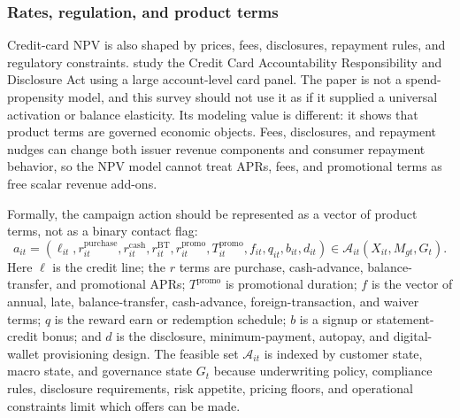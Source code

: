 \documentclass[11pt]{article}
\newcommand{\1}{\mathbf{1}}
\begin{document}
\subsubsection{Rates, regulation, and product terms}

Credit-card NPV is also shaped by prices, fees, disclosures, repayment rules,
and regulatory constraints. \citet{agarwal2013cardact} study the Credit Card
Accountability Responsibility and Disclosure Act using a large account-level
card panel. The paper is not a spend-propensity model, and this survey should
not use it as if it supplied a universal activation or balance elasticity. Its
modeling value is different: it shows that product terms are governed economic
objects. Fees, disclosures, and repayment nudges can change both issuer revenue
components and consumer repayment behavior, so the NPV model cannot treat APRs,
fees, and promotional terms as free scalar revenue add-ons.

Formally, the campaign action should be represented as a vector of product
terms, not as a binary contact flag:
\begin{equation}
  a_{it}
  =
  \left(
    \ell_{it}, r^{\mathrm{purchase}}_{it},
    r^{\mathrm{cash}}_{it}, r^{\mathrm{BT}}_{it},
    r^{\mathrm{promo}}_{it}, T^{\mathrm{promo}}_{it},
    f_{it}, q_{it}, b_{it}, d_{it}
  \right)
  \in \mathcal{A}_{it}(X_{it},M_{gt},G_t).
  \label{eq:offer-vector}
\end{equation}
Here $\ell$ is the credit line; the $r$ terms are purchase, cash-advance,
balance-transfer, and promotional APRs; $T^{\mathrm{promo}}$ is promotional
duration; $f$ is the vector of annual, late, balance-transfer, cash-advance,
foreign-transaction, and waiver terms; $q$ is the reward earn or redemption
schedule; $b$ is a signup or statement-credit bonus; and $d$ is the disclosure,
minimum-payment, autopay, and digital-wallet provisioning design. The feasible
set $\mathcal{A}_{it}$ is indexed by customer state, macro state, and governance
state $G_t$ because underwriting policy, compliance rules, disclosure
requirements, risk appetite, pricing floors, and operational constraints limit
which offers can be made.
\end{document}
